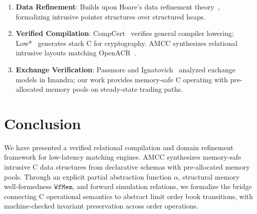 \documentclass[11pt,a4paper]{article}
\begin{document}
\begin{enumerate}[leftmargin=*]
    \item \textbf{Data Refinement}: Builds upon Hoare's data refinement theory~\cite{hoare_refinement}, formalizing intrusive pointer structures over structured heaps.
    \item \textbf{Verified Compilation}: CompCert~\cite{compcert} verifies general compiler lowering; Low*~\cite{hacl_star} generates stack C for cryptography. AMCC synthesizes relational intrusive layouts matching OpenACR~\cite{openacr}.
    \item \textbf{Exchange Verification}: Passmore and Ignatovich~\cite{clob_verification} analyzed exchange models in Imandra; our work provides memory-safe C operating with pre-allocated memory pools on steady-state trading paths.
\end{enumerate}

\section{Conclusion}
\label{sec:conclusion}

We have presented a verified relational compilation and domain refinement framework for low-latency matching engines. AMCC synthesizes memory-safe intrusive C data structures from declarative schemas with pre-allocated memory pools. Through an explicit partial abstraction function $\alpha$, structural memory well-formedness $\mathtt{WfMem}$, and forward simulation relations, we formalize the bridge connecting C operational semantics to abstract limit order book transitions, with machine-checked invariant preservation across order operations.
\end{document}
